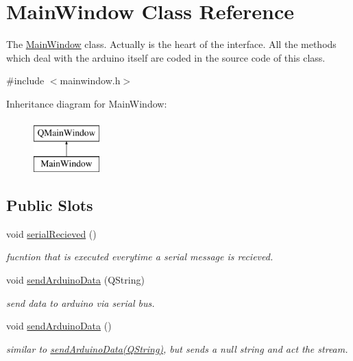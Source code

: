 \hypertarget{class_main_window}{\section{Main\+Window Class Reference}
\label{class_main_window}
}


The \hyperlink{class_main_window}{Main\+Window} class. Actually is the heart of the interface. All the methods which deal with the arduino itself are coded in the source code of this class.  




{\ttfamily \#include $<$mainwindow.\+h$>$}

Inheritance diagram for Main\+Window\+:\begin{figure}[H]
\begin{center}
\leavevmode
\includegraphics[height=2.000000cm]{class_main_window}
\end{center}
\end{figure}
\subsection*{Public Slots}
\begin{DoxyCompactItemize}
\item 
void \hyperlink{class_main_window_aa0fc566d545a96cb559b8592605b042f}{serial\+Recieved} ()
\begin{DoxyCompactList}\small\item\em fucntion that is executed everytime a serial message is recieved. \end{DoxyCompactList}\item 
void \hyperlink{class_main_window_ae7adeab38af0ac01546badd6baf64270}{send\+Arduino\+Data} (Q\+String)
\begin{DoxyCompactList}\small\item\em send data to arduino via serial bus. \end{DoxyCompactList}\item 
\hypertarget{class_main_window_a4c5237443e9322aa767ef8c307bd2603}{void \hyperlink{class_main_window_a4c5237443e9322aa767ef8c307bd2603}{send\+Arduino\+Data} ()}\label{class_main_window_a4c5237443e9322aa767ef8c307bd2603}

\begin{DoxyCompactList}\small\item\em similar to \hyperlink{class_main_window_ae7adeab38af0ac01546badd6baf64270}{send\+Arduino\+Data(\+Q\+String)}, but sends a null string and act the stream. \end{DoxyCompactList}\end{DoxyCompactItemize}
